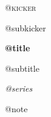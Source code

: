 \hypersetup{pageanchor=false}
\begin{titlepage}
\thispagestyle{empty}
\centering
\vspace*{0.14\textheight}
{\large\scshape @{kicker}\par}
\vspace{0.35em}
{\small @{subkicker}\par}
\vspace{1.5em}
{\Huge\bfseries @{title}\par}
\vspace{0.9em}
{\Large @{subtitle}\par}
\vspace{1.4em}
{\normalsize\itshape @{series}\par}
\vfill
{\footnotesize @{note}\par}
\vspace{1.2em}
\end{titlepage}
